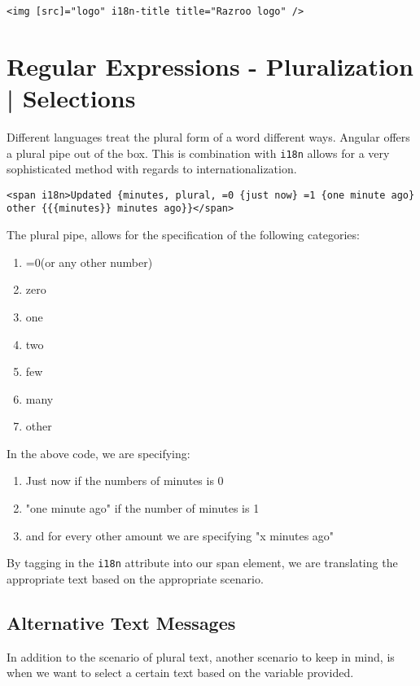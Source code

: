 \begin{lstlisting}
<img [src]="logo" i18n-title title="Razroo logo" />
\end{lstlisting}

\section{ Regular Expressions - Pluralization | Selections }
Different languages treat the plural form of a word different ways. Angular 
offers a plural pipe out of the box. This is combination with \lstinline{i18n}
allows for a very sophisticated method with regards to internationalization. 

\begin{lstlisting}
<span i18n>Updated {minutes, plural, =0 {just now} =1 {one minute ago} other {{{minutes}} minutes ago}}</span>
\end{lstlisting}

The plural pipe, allows for the specification of the following categories: 
\begin{enumerate}
\item =0(or any other number)  
\item zero  
\item one
\item two
\item few
\item many
\item other
\end{enumerate}

In the above code, we are specifying: 
\begin{enumerate}
\item Just now if the numbers of minutes is 0 
\item "one minute ago" if the number of minutes is 1
\item and for every other amount we are specifying "x minutes ago" 
\end{enumerate}

By tagging in the \lstinline{i18n} attribute into our span element, we are 
translating the appropriate text based on the appropriate scenario. 

\subsection{Alternative Text Messages}
In addition to the scenario of plural text, another scenario to keep in mind, 
is when we want to select a certain text based on the variable provided. 

